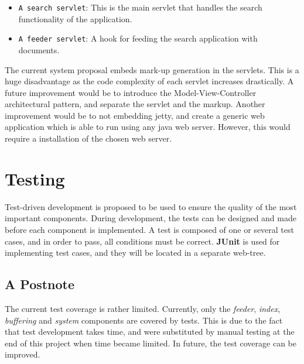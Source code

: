 \begin{itemize}
\item {\tt A search servlet}: This is the main servlet that handles the search functionality of the application.
\item {\tt A feeder servlet}: A hook for feeding the search application with documents.
\end{itemize}

The current system proposal embeds mark-up generation in the servlets. This is a huge disadvantage as the code complexity of each servlet increases drastically. A future improvement would be to introduce the Model-View-Controller architectural pattern, and separate the servlet and the markup. Another improvement would be to not embedding jetty, and create a generic web application which is able to run using any java web server. However, this would require a installation of the chosen web server.

\section{Testing}
Test-driven development is proposed to be used to ensure the quality of the most important components. During development, the tests can be designed and made before each component is implemented. A test is composed of one or several test cases, and in order to pass, all conditions must be correct. {\bf JUnit} is used for implementing test cases, and they will be located in a separate web-tree.

\subsection{A Postnote}
The current test coverage is rather limited. Currently, only the {\it feeder}, {\it index}, {\it buffering} and {\it system} components are covered by tests. This is due to the fact that test development takes time, and were substituted by manual testing at the end of this project when time became limited. In future, the test coverage can be improved.